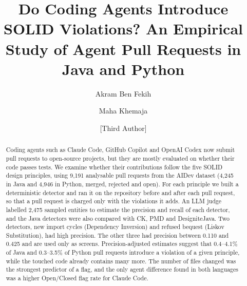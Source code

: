 \documentclass[sigconf]{acmart}
\begin{document}
\title{Do Coding Agents Introduce SOLID Violations? An Empirical Study of Agent Pull Requests in
Java and Python}

\author{Akram Ben Fekih}

\author{Maha Khemaja}

\author{[Third Author]}
\affiliation{%
  \institution{[Institution]}
  \city{[City]}
  \country{[Country]}}
\email{[email]}

\renewcommand{\shortauthors}{Ben Fekih et al.}

\begin{abstract}
Coding agents such as Claude Code, GitHub Copilot and OpenAI Codex now submit pull requests to
open-source projects, but they are mostly evaluated on whether their code passes tests. We examine
whether their contributions follow the five SOLID design principles, using 9,191 analysable pull
requests from the AIDev dataset (4,245 in Java and 4,946 in Python, merged, rejected and open). For
each principle we built a deterministic detector and ran it on the repository before and after each
pull request, so that a pull request is charged only with the violations it adds. An LLM judge
labelled 2,475 sampled entities to estimate the precision and recall of each detector, and the Java
detectors were also compared with CK, PMD and DesigniteJava. Two detectors, new import cycles
(Dependency Inversion) and refused bequest (Liskov Substitution), had high precision. The
other three had precision between 0.110 and 0.425 and are used only as screens. Precision-adjusted
estimates suggest that 0.4--4.1\% of Java and 0.3--3.5\% of Python pull requests introduce a
violation of a given principle, while the touched code already contains many more. The number of
files changed was the strongest predictor of a flag, and the only agent difference found in both
languages was a higher Open/Closed flag rate for Claude Code.
\end{abstract}


\end{document}
